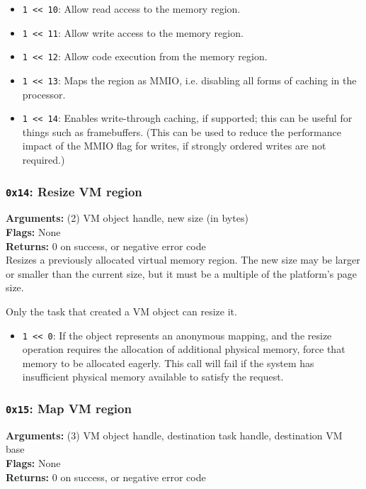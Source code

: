 \documentclass[11pt]{article}
\begin{document}
\begin{itemize}
\item \texttt{1 << 10}: Allow read access to the memory region.
\item \texttt{1 << 11}: Allow write access to the memory region.
\item \texttt{1 << 12}: Allow code execution from the memory region.
\item \texttt{1 << 13}: Maps the region as MMIO, i.e. disabling all forms of caching in the processor.
\item \texttt{1 << 14}: Enables write-through caching, if supported; this can be useful for things such as framebuffers. (This can be used to reduce the performance impact of the MMIO flag for writes, if strongly ordered writes are not required.)
\end{itemize}

\subsubsection{{\tt 0x14}: Resize VM region}
\textbf{Arguments:} (2) VM object handle, new size (in bytes) \\
\textbf{Flags:} None \\
\textbf{Returns:} 0 on success, or negative error code \\

Resizes a previously allocated virtual memory region. The new size may be larger or smaller than the current size, but it must be a multiple of the platform's page size.

Only the task that created a VM object can resize it.

\begin{itemize}
\item \texttt{1 << 0}: If the object represents an anonymous mapping, and the resize operation requires the allocation of additional physical memory, force that memory to be allocated eagerly. This call will fail if the system has insufficient physical memory available to satisfy the request.
\end{itemize}

\subsubsection{{\tt 0x15}: Map VM region}
\textbf{Arguments:} (3) VM object handle, destination task handle, destination VM base \\
\textbf{Flags:} None \\
\textbf{Returns:} 0 on success, or negative error code \\
\end{document}
